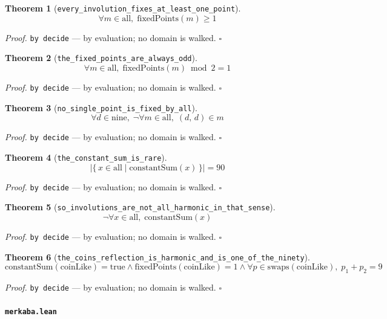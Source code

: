 \documentclass[11pt]{article}
\newtheorem{theorem}{Theorem}[section]
\begin{document}
\begin{theorem}[\texttt{every\_involution\_fixes\_at\_least\_one\_point}]
\[ \forall m \in \mathrm{all},\; \mathrm{fixedPoints}\mathopen{}\left(m\right) \ge 1 \]
\end{theorem}
\noindent\emph{Proof.} \texttt{by decide} --- by evaluation; no domain is walked. \hfill$\square$

\begin{theorem}[\texttt{the\_fixed\_points\_are\_always\_odd}]
\[ \forall m \in \mathrm{all},\; \mathrm{fixedPoints}\mathopen{}\left(m\right) \bmod 2 = 1 \]
\end{theorem}
\noindent\emph{Proof.} \texttt{by decide} --- by evaluation; no domain is walked. \hfill$\square$

\begin{theorem}[\texttt{no\_single\_point\_is\_fixed\_by\_all}]
\[ \forall d \in \mathrm{nine},\; \lnot \forall m \in \mathrm{all},\; \left(d,\,d\right) \in m \]
\end{theorem}
\noindent\emph{Proof.} \texttt{by decide} --- by evaluation; no domain is walked. \hfill$\square$

\begin{theorem}[\texttt{the\_constant\_sum\_is\_rare}]
\[ \left|\{\, x \in \mathrm{all} \mid \mathrm{constantSum}\mathopen{}\left(x\right) \,\}\right| = 90 \]
\end{theorem}
\noindent\emph{Proof.} \texttt{by decide} --- by evaluation; no domain is walked. \hfill$\square$

\begin{theorem}[\texttt{so\_involutions\_are\_not\_all\_harmonic\_in\_that\_sense}]
\[ \lnot \forall x \in \mathrm{all},\; \mathrm{constantSum}\mathopen{}\left(x\right) \]
\end{theorem}
\noindent\emph{Proof.} \texttt{by decide} --- by evaluation; no domain is walked. \hfill$\square$

\begin{theorem}[\texttt{the\_coins\_reflection\_is\_harmonic\_and\_is\_one\_of\_the\_ninety}]
\[ \mathrm{constantSum}\mathopen{}\left(\mathrm{coinLike}\right) = \mathrm{true} \land \mathrm{fixedPoints}\mathopen{}\left(\mathrm{coinLike}\right) = 1 \land \forall p \in \mathrm{swaps}\mathopen{}\left(\mathrm{coinLike}\right),\; p_{1} + p_{2} = 9 \]
\end{theorem}
\noindent\emph{Proof.} \texttt{by decide} --- by evaluation; no domain is walked. \hfill$\square$

\paragraph{\texttt{merkaba.lean}}
\end{document}
